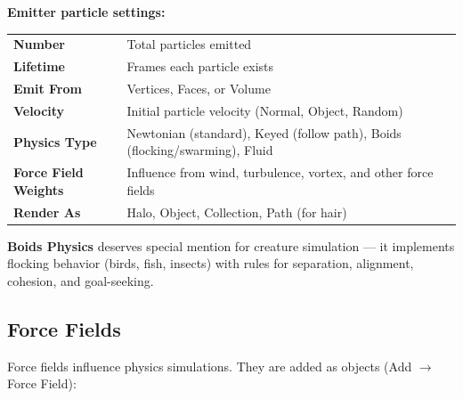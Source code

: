 \textbf{Emitter particle settings:}

\begin{center}
\begin{tabularx}{\textwidth}{L{3cm}X}
\toprule
{}
 &  \\
\midrule
\textbf{Number} & Total particles emitted \\
\textbf{Lifetime} & Frames each particle exists \\
\textbf{Emit From} & Vertices, Faces, or Volume \\
\textbf{Velocity} & Initial particle velocity (Normal, Object, Random) \\
\textbf{Physics Type} & Newtonian (standard), Keyed (follow path), Boids (flocking/swarming), Fluid \\
\textbf{Force Field Weights} & Influence from wind, turbulence, vortex, and other force fields \\
\textbf{Render As} & Halo, Object, Collection, Path (for hair) \\
\bottomrule
\end{tabularx}
\end{center}

\textbf{Boids Physics} deserves special mention for creature simulation --- it implements flocking behavior (birds, fish, insects) with rules for separation, alignment, cohesion, and goal-seeking.

\subsection{Force Fields}
\label{subsec:force-fields}

Force fields influence physics simulations. They are added as objects (Add $\rightarrow$ Force Field):


